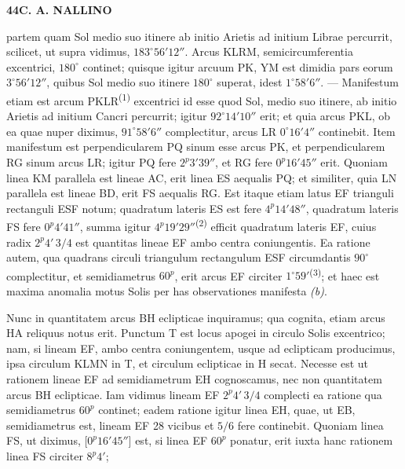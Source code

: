 \documentclass[10pt]{article}
\newcommand{\A}[1]{\hypertarget{#1}{}}
\newcommand{\NM}[1]{\textsuperscript{(#1)}}
\newcommand{\SP}[3]{%
  \clearpage
  \A{AB01-PDF#1}%
  \begin{center}\textbf{#2\quad #3}\end{center}%
}
\begin{document}

\SP{0133}{44}{C. A. NALLINO}

\A{AB01-PDF0133-P01}
partem quam Sol medio suo itinere ab initio Arietis ad initium
Librae percurrit, scilicet, ut supra vidimus,
$183^\circ56'12''$. Arcus KLRM, semicircumferentia excentrici,
$180^\circ$ continet; quisque igitur arcuum PK, YM est dimidia
pars eorum $3^\circ56'12''$, quibus Sol medio suo itinere
$180^\circ$ superat, idest $1^\circ58'6''$. — Manifestum etiam
est arcum PKLR\NM{1} excentrici id esse quod Sol, medio suo
itinere, ab initio Arietis ad initium Cancri percurrit; igitur
$92^\circ14'10''$ erit; et quia arcus PKL, ob ea quae nuper
diximus, $91^\circ58'6''$ complectitur, arcus LR $0^\circ16'4''$
continebit. Item manifestum est perpendicularem PQ sinum esse
arcus PK, et perpendicularem RG sinum arcus LR; igitur PQ fere
$2^{p}3'39''$, et RG fere $0^{p}16'45''$ erit. Quoniam linea KM
parallela est lineae AC, erit linea ES aequalis PQ; et similiter,
quia LN parallela est lineae BD, erit FS aequalis RG. Est itaque
etiam latus EF trianguli rectanguli ESF notum; quadratum lateris
ES est fere $4^{p}14'48''$, quadratum lateris FS fere
$0^{p}4'41''$, summa igitur $4^{p}19'29''$\NM{2} efficit quadratum
lateris EF, cuius radix $2^{p}4'\,3/4$ est quantitas lineae EF
ambo centra coniungentis. Ea ratione autem, qua quadrans circuli
triangulum rectangulum ESF circumdantis $90^\circ$ complectitur,
et semidiametrus $60^{p}$, erit arcus EF circiter
$1^\circ59'$\NM{3}; et haec est maxima anomalia motus Solis per
has observationes manifesta \textit{(b)}.

\A{AB01-PDF0133-P02}
Nunc in quantitatem arcus BH eclipticae inquiramus; qua cognita,
etiam arcus HA reliquus notus erit. Punctum T est locus apogei in
circulo Solis excentrico; nam, si lineam EF, ambo centra
coniungentem, usque ad eclipticam producimus, ipsa circulum KLMN
in T, et circulum eclipticae in H secat. Necesse est ut rationem
lineae EF ad semidiametrum EH cognoscamus, nec non quantitatem
arcus BH eclipticae. Iam vidimus lineam EF $2^{p}4'\,3/4$
complecti ea ratione qua semidiametrus $60^{p}$ continet; eadem
ratione igitur linea EH, quae, ut EB, semidiametrus est, lineam
EF 28 vicibus et $5/6$ fere continebit. Quoniam linea FS, ut
diximus, [$0^{p}16'45''$] est, si linea EF $60^{p}$ ponatur,
erit iuxta hanc rationem linea FS circiter $8^{p}4'$;
\end{document}

